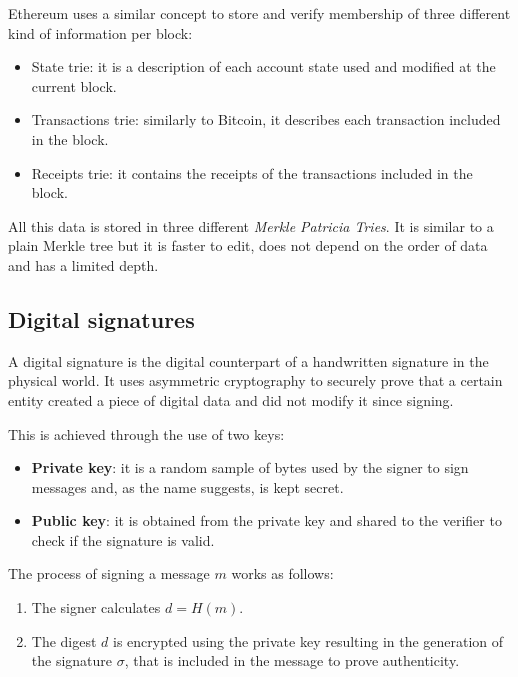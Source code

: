 Ethereum uses a similar concept to store and verify membership of three different kind of information per block: 

\begin{itemize}
    \item State trie: it is a description of each account state used and modified at the current block.
    \item Transactions trie: similarly to Bitcoin, it describes each transaction included in the block.
    \item Receipts trie: it contains the receipts of the transactions included in the block.
\end{itemize}

All this data is stored in three different \textit{Merkle Patricia Tries}. It is similar to a plain Merkle tree but it is faster to edit, does not depend on the order of data and has a limited depth.

\subsection{Digital signatures}

A digital signature is the digital counterpart of a handwritten signature in the physical world. It uses asymmetric cryptography to securely prove that a certain entity created a piece of digital data and did not modify it since signing. 

This is achieved through the use of two keys:

\begin{itemize}
    \item \textbf{Private key}: it is a random sample of bytes used by the signer to sign messages and, as the name suggests, is kept secret.
    \item \textbf{Public key}: it is obtained from the private key and shared to the verifier to check if the signature is valid.
\end{itemize}

The process of signing a message $m$ works as follows:

\begin{enumerate}
    \item The signer calculates $d=H(m)$.
    \item The digest $d$ is encrypted using the private key resulting in the generation of the signature $\sigma$, that is included in the message to prove authenticity.
\end{enumerate}

